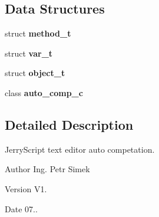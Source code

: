 \subsection*{Data Structures}
\begin{DoxyCompactItemize}
\item 
struct \textbf{ method\+\_\+t}
\item 
struct \textbf{ var\+\_\+t}
\item 
struct \textbf{ object\+\_\+t}
\item 
class \textbf{ auto\+\_\+comp\+\_\+c}
\end{DoxyCompactItemize}


\subsection{Detailed Description}
Jerry\+Script text editor auto competation. 

\begin{DoxyAuthor}{Author}
Ing. Petr Simek 
\end{DoxyAuthor}
\begin{DoxyVersion}{Version}
V1. 
\end{DoxyVersion}
\begin{DoxyDate}{Date}
07.. 
\end{DoxyDate}
